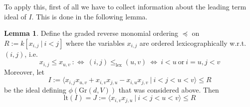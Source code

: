 \documentclass{scrartcl}
\newcommand{\Gr}{\mathrm{Gr}}
\theoremstyle{definition}
\newtheorem{lemma}[subsection]{Lemma}
\begin{document}
To apply this, first of all we have to collect information about the leading term ideal of $I$.
This is done in the following lemma.
\begin{lemma}
    \label{prop:leading_term_ideal_grassmanian}
    Define the graded reverse monomial ordering $\preceq$ on $R := k[x_{i, j} \ | \ i < j]$ where the variables $x_{i, j}$ are ordered lexicographically w.r.t. $(i, j)$, i.e.
    \begin{equation*}
        x_{i, j} \leq x_{u, v} \ :\Leftrightarrow \ (i, j) \leq_{\text{lex}} (u, v) \ \Leftrightarrow \ i < u \ \text{or} \ i = u, j < v
    \end{equation*}
    Moreover, let
    \begin{equation*}
        I := \langle x_{i, j}x_{u, v} + x_{i, v}x_{j, u} - x_{i, u}x_{j, v} \ | \ i < j < u < v \rangle \leq R
    \end{equation*}
    be the ideal defining $\phi(\Gr(d, V))$ that was considered above. Then
    \begin{equation*}
        \mathrm{lt}(I) = J := \langle x_{i, v} x_{j, u} \ | \ i < j < u < v \rangle \leq R
    \end{equation*}
\end{lemma}
\end{document}
